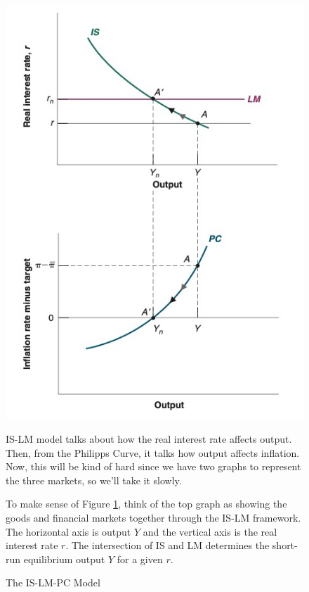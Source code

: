 \documentclass{extarticle}
\begin{document}
\begin{figure}[H] 
  \centering %
  \begin{minipage}{0.4\linewidth} 
    \centering 
    \includegraphics[width=\linewidth]{IS-LM-PC.png} 
    \caption{The IS-LM-PC Model} 
    \label{fig:IS-LM-PC} 
  \end{minipage}%
  \begin{minipage}{0.6\linewidth} 
    IS-LM model talks about how the real interest rate affects output.  Then, from the Philipps Curve, it talks how output affects inflation. Now, this will be kind of hard since we have two graphs to represent the three markets, so we'll take it slowly.

    \vspace{2mm}

    To make sense of Figure \ref{fig:IS-LM-PC}, think of the top graph as showing the goods and financial markets together through the IS-LM framework. 
    The horizontal axis is output $Y$ and the vertical axis is the real interest rate $r$. The intersection of IS and LM determines the short-run equilibrium output $Y$ for a given $r$.


\end{minipage}
\end{figure}
\end{document}
